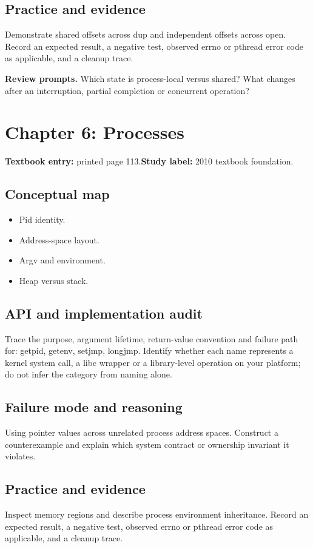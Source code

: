 \documentclass[11pt,letterpaper,oneside]{report}
\begin{document}
\subsection{Practice and evidence}
Demonstrate shared offsets across dup and independent offsets across open. Record an expected result, a negative test, observed errno or pthread error code as applicable, and a cleanup trace.

\textbf{Review prompts.} Which state is process-local versus shared? What changes after an interruption, partial completion or concurrent operation?

\section{Chapter 6: Processes}
\textbf{Textbook entry:} printed page 113.\quad \textbf{Study label:} 2010 textbook foundation.

\subsection{Conceptual map}
\begin{itemize}
\item Pid identity.
\item Address-space layout.
\item Argv and environment.
\item Heap versus stack.
\end{itemize}
\subsection{API and implementation audit}
Trace the purpose, argument lifetime, return-value convention and failure path for: getpid, getenv, setjmp, longjmp. Identify whether each name represents a kernel system call, a libc wrapper or a library-level operation on your platform; do not infer the category from naming alone.

\subsection{Failure mode and reasoning}
Using pointer values across unrelated process address spaces. Construct a counterexample and explain which system contract or ownership invariant it violates.

\subsection{Practice and evidence}
Inspect memory regions and describe process environment inheritance. Record an expected result, a negative test, observed errno or pthread error code as applicable, and a cleanup trace.
\end{document}
